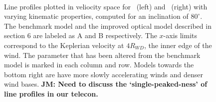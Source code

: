 \documentclass[preprint, a4paper, 11pt]{aastex}
\begin{document}
\begin{figure} %
\mbox{
\quad
{}   
}
\caption{
Line profiles plotted in veliocity space 
for \ha\ (left) and \heiiopt\ (right) with varying kinematic 
properties, computed for an inclination of $80^\circ$.
The benchmark model and the improved optical
model described in section 6 are labeled as A and B respectively. 
The $x$-axis limits correspond to the Keplerian velocity at 
$4R_{WD}$, the inner edge of the wind.
The parameter that has been altered from the benchmark model 
is marked in each column and row. Models towards the bottom right
are have more slowly accelerating winds and denser wind bases. 
{\bf JM: Need to discuss the `single-peaked-ness' of line profiles
in our telecon.}
}
\label{halpha}
\end{figure} %
\end{document}
